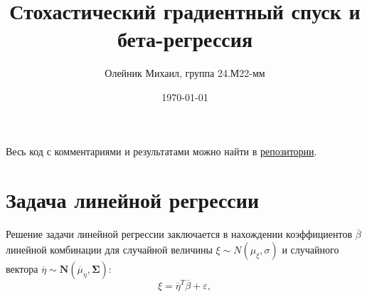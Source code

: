 \documentclass[12pt]{article}
\title{Стохастический градиентный спуск и бета-регрессия}
\author{Олейник Михаил, группа 24.М22-мм}
\date{\today}
\begin{document}
	\maketitle
	
	Весь код с комментариями и результатами можно найти в \href{https://github.com/UnicornRed/GradientDescentBeta}{репозитории}.
	
	\section{Задача линейной регрессии}
	
	Решение задачи линейной регрессии заключается в нахождении коэффициентов $\overline\beta$ линейной комбинации для случайной величины $\xi \sim N(\mu _\xi, \sigma)$ и случайного вектора $\overline{\eta} \sim \mathbf{N}(\overline \mu _\eta, \mathbf{\Sigma})$:
	\[
	\xi = \overline\eta ^T \overline\beta + \varepsilon,
	\]
	
\end{document}

